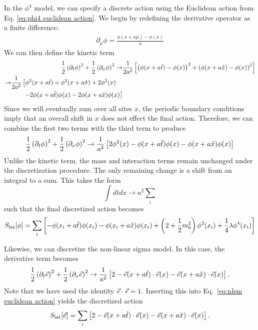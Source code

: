 In the $\phi^4$ model, we can specify a discrete action using the Euclidean action from Eq. \ref{eq:phi4 euclidean action}. We begin by redefining the derivative operator as a finite difference:
\begin{align}
    \partial_\mu \phi = \frac{\phi\left(x + a \hat{\mu}\right) - \phi(x)}{a}
\end{align}
We can then define the kinetic term
\begin{align}
    \half \left(\partial_t\phi\right)^2 + \half \left(\partial_x\phi\right)^2 \rightarrow& \frac{1}{2a^2}\left[ \left(\phi(x+a \hat{t}) -\phi(x)\right)^2 + \left(\phi(x+a \hat{x}) -\phi(x)\right)^2\right]\nonumber \\
    \begin{split} \rightarrow& \frac{1}{2a^2}\left[ \phi^2(x+a\hat{t}) + \phi^2(x+a\hat{x}) + 2\phi^2(x)\right.\\ &\qquad \left.- 2\phi(x+a\hat{t})\phi(x) - 2\phi(x+a\hat{x})\phi(x) \right]\hfilneg\end{split}
\end{align}
Since we will eventually sum over all sites $x$, the periodic boundary conditions imply that an overall shift in $x$ does not effect the final action. Therefore, we can combine the first two terms with the third term to produce 
\begin{equation}
    \frac{1}{2} \left(\partial_t\phi\right)^2 + \frac{1}{2} \left(\partial_x\phi\right)^2 \rightarrow \frac{1}{a^2}\left[ 2\phi^2(x) - \phi(x+a\hat{t})\phi(x) - \phi(x+a\hat{x})\phi(x) \right]
\end{equation}
Unlike the kinetic term, the mass and interaction terms remain unchanged under the discretization procedure. The only remaining change is a shift from an integral to a sum. This takes the form
\begin{equation}
    \label{eq:disc def}
    \int dtdx \rightarrow a^2 \sum_i
\end{equation}
such that the final discretized action becomes
\begin{equation}
    \label{eq:phi4 discretized action}
    S_{\mathrm{lat}}[\phi] = \sum_i \left[-\phi(x_i + a\hat{t})\phi(x_i) - \phi(x_i + a\hat{x})\phi(x_i) + \left(2+\frac{1}{2} m_0^2\right)\phi^2(x_i) + \frac{1}{4}\lambda \phi^4(x_i)\right]
\end{equation}

Likewise, we can discretize the non-linear sigma model. In this case, the derivative term becomes 
\begin{equation}
    \frac{1}{2} \left(\partial_t\vec e\right)^2 + \frac{1}{2} \left(\partial_x\vec e\right)^2 \rightarrow \frac{1}{a^2}\left[ 2 - \vec e(x+a\hat{t})\cdot\vec e(x) - \vec e(x+a\hat{x})\cdot\vec e(x) \right].
\end{equation}
Note that we have used the identity $\vec e\cdot\vec e = 1$. Inserting this into Eq.~\ref{eq:nlsm euclidean action} yields the discretized action
\begin{equation}
    \label{eq:nlsm discretized action}
    S_\mathrm{lat}[\vec e] = \sum_i \left[ 2 - \vec e(x+a\hat{t})\cdot\vec e(x) - \vec e(x+a\hat{x})\cdot\vec e(x) \right].
\end{equation}

